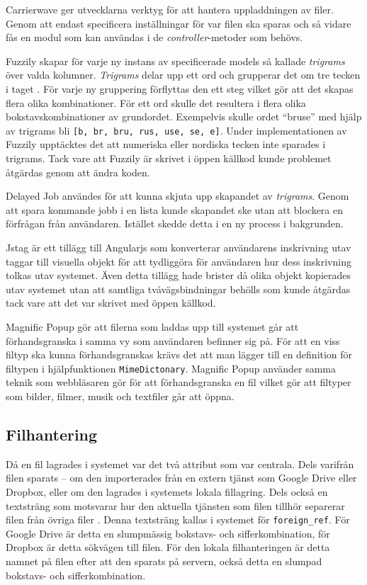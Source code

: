 Carrierwave ger utvecklarna verktyg för att hantera uppladdningen av filer.
Genom att endast specificera inställningar för var filen ska sparas och så
vidare fås en modul som kan användas i de \emph{controller}-metoder som behövs.

Fuzzily skapar för varje ny instans av specificerade models så kallade
\emph{trigrams} över valda kolumner. \emph{Trigrams} delar upp ett ord och
grupperar det om tre tecken i taget \cite{n-grams}. För varje ny gruppering
förflyttas den ett steg vilket gör att det skapas flera olika kombinationer.
För ett ord skulle det resultera i flera olika bokstavskombinationer av
grundordet. Exempelvis skulle ordet ``bruse'' med hjälp av trigrams bli
\texttt{[b, br, bru, rus, use, se, e]}. Under implementationen av Fuzzily
upptäcktes det att  numeriska eller nordiska tecken inte sparades i trigrams.
Tack vare att Fuzzily är skrivet i öppen källkod kunde problemet åtgärdas genom
att ändra koden.

Delayed Job användes för att kunna skjuta upp skapandet av \emph{trigrams}.
Genom att spara kommande jobb i en lista kunde skapandet ske utan att blockera
en förfrågan från användaren. Istället skedde detta i en ny process i
bakgrunden.

Jstag är ett tillägg till Angularjs som konverterar användarens inskrivning
utav taggar till visuella objekt för att tydliggöra för användaren hur dess
inskrivning tolkas utav systemet. Även detta tillägg hade brister då olika
objekt kopierades utav systemet utan att samtliga tvåvägsbindningar behölls som
kunde åtgärdas tack vare att det var skrivet med öppen källkod.

Magnific Popup gör att filerna som laddas upp till systemet går att
förhandsgranska i samma vy som användaren befinner sig på. För att en viss
filtyp ska kunna förhandsgranskas krävs det att man lägger till en definition
för filtypen i hjälpfunktionen \texttt{MimeDictonary}. Magnific Popup använder
samma teknik som webbläsaren gör för att förhandsgranska en fil vilket gör att
filtyper som bilder, filmer, musik och textfiler går att öppna.

\subsection{Filhantering}

Då en fil lagrades i systemet var det två attribut som var centrala. Dels
varifrån filen sparats – om den importerades från en extern tjänst som Google
Drive eller Dropbox, eller om den lagrades i systemets lokala fillagring. Dels
också en textsträng som motsvarar hur den aktuella tjänsten som filen tillhör
separerar filen från övriga filer . Denna textsträng kallas i systemet för
\texttt{foreign\_ref}. För Google Drive är detta en slumpmässig bokstavs- och
sifferkombination, för Dropbox är detta sökvägen till filen. För den lokala
filhanteringen är detta namnet på filen efter att den sparats på servern, också
detta en slumpad bokstavs- och sifferkombination.

